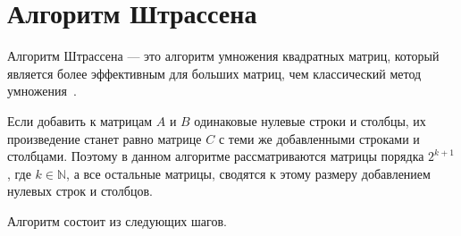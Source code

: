 \section{Алгоритм Штрассена}

Алгоритм Штрассена --- это алгоритм умножения квадратных матриц, который является более эффективным для больших матриц, чем классический метод умножения~\cite{strassen}.

Если добавить к матрицам $A$ и $B$ одинаковые нулевые строки и столбцы, их произведение станет равно матрице $C$ с теми же добавленными строками и столбцами. 
Поэтому в данном алгоритме рассматриваются матрицы порядка $2^{k + 1}$, где $ k \in \mathbb{N} $, а все остальные матрицы, сводятся к этому размеру добавлением нулевых строк и столбцов. 

Алгоритм состоит из следующих шагов.

